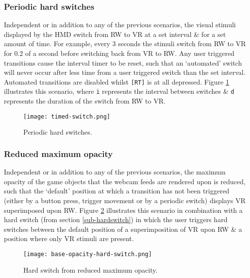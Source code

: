 \subsubsection{Periodic hard switches}
\label{subsub-periodic}
Independent or in addition to any of the previous scenarios, the visual stimuli displayed by the HMD switch from RW to VR at a set interval \& for a set amount of time. For example, every 3 seconds the stimuli switch from RW to VR for 0.2 of a second before switching back from VR to RW. Any user triggered transitions cause the interval timer to be reset, such that an `automated' switch will never occur after less time from a user triggered switch than the set interval. Automated transitions are disabled whilst \texttt{[RT]} is at all depressed. Figure \ref{scenariotimed} illustrates this scenario, where \texttt{i} represents the interval between switches \& \texttt{d} represents the duration of the switch from RW to VR.

\begin{figure}[h]
	\begin{center}
		\texttt{[image: timed-switch.png]}
		\caption{Periodic hard switches.}
		\label{scenariotimed}
	\end{center}
\end{figure}


\subsubsection{Reduced maximum opacity}
\label{subsub-baseopacity}
Independent or in addition to any of the previous scenarios, the maximum opacity of the game objects that the webcam feeds are rendered upon is reduced, such that the `default' position at which a transition has not been triggered (either by a button press, trigger movement or by a periodic switch) displays VR superimposed upon RW. Figure \ref{scenariobaseopacity} illustrates this scenario in combination with a hard switch (from section \ref{sub-hardswitch}) in which the user triggers hard switches between the default position of a superimposition of VR upon RW \& a position where only VR stimuli are present.

\begin{figure}[h]
	\begin{center}
		\texttt{[image: base-opacity-hard-switch.png]}
		\caption{Hard switch from reduced maximum opacity.}
		\label{scenariobaseopacity}
	\end{center}
\end{figure}


